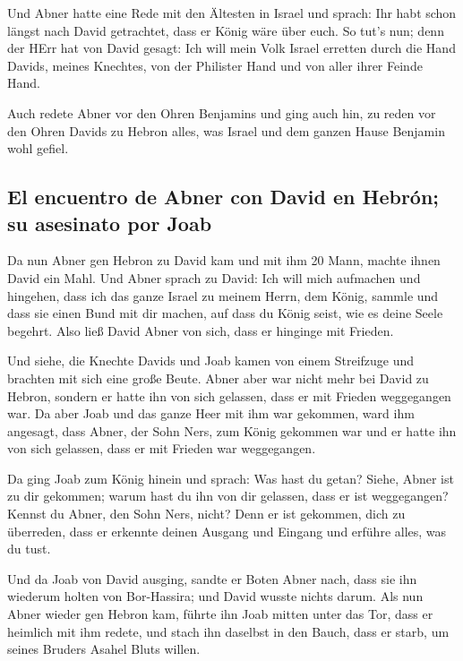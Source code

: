  Und Abner hatte eine Rede mit den Ältesten in Israel und
sprach: Ihr habt schon längst nach David getrachtet, dass er König wäre
über euch.  So tut's nun; denn der HErr hat von David
gesagt: Ich will mein Volk Israel erretten durch die Hand Davids, meines
Knechtes, von der Philister Hand und von aller ihrer Feinde Hand.

 Auch redete Abner vor den Ohren Benjamins und ging auch
hin, zu reden vor den Ohren Davids zu Hebron alles, was Israel und dem
ganzen Hause Benjamin wohl gefiel.

\hypertarget{el-encuentro-de-abner-con-david-en-hebruxf3n-su-asesinato-por-joab}{%
\subsection{El encuentro de Abner con David en Hebrón; su asesinato por
Joab}\label{el-encuentro-de-abner-con-david-en-hebruxf3n-su-asesinato-por-joab}}

 Da nun Abner gen Hebron zu David kam und mit ihm 20
Mann, machte ihnen David ein Mahl.  Und Abner sprach zu
David: Ich will mich aufmachen und hingehen, dass ich das ganze Israel
zu meinem Herrn, dem König, sammle und dass sie einen Bund mit dir
machen, auf dass du König seist, wie es deine Seele begehrt. Also ließ
David Abner von sich, dass er hinginge mit Frieden.

 Und siehe, die Knechte Davids und Joab kamen von einem
Streifzuge und brachten mit sich eine große Beute. Abner aber war nicht
mehr bei David zu Hebron, sondern er hatte ihn von sich gelassen, dass
er mit Frieden weggegangen war.  Da aber Joab und das
ganze Heer mit ihm war gekommen, ward ihm angesagt, dass Abner, der Sohn
Ners, zum König gekommen war und er hatte ihn von sich gelassen, dass er
mit Frieden war weggegangen.

 Da ging Joab zum König hinein und sprach: Was hast du
getan? Siehe, Abner ist zu dir gekommen; warum hast du ihn von dir
gelassen, dass er ist weggegangen?  Kennst du Abner, den
Sohn Ners, nicht? Denn er ist gekommen, dich zu überreden, dass er
erkennte deinen Ausgang und Eingang und erführe alles, was du tust.

 Und da Joab von David ausging, sandte er Boten Abner
nach, dass sie ihn wiederum holten von Bor-Hassira; und David wusste
nichts darum.  Als nun Abner wieder gen Hebron kam,
führte ihn Joab mitten unter das Tor, dass er heimlich mit ihm redete,
und stach ihn daselbst in den Bauch, dass er starb, um seines Bruders
Asahel Bluts willen.

